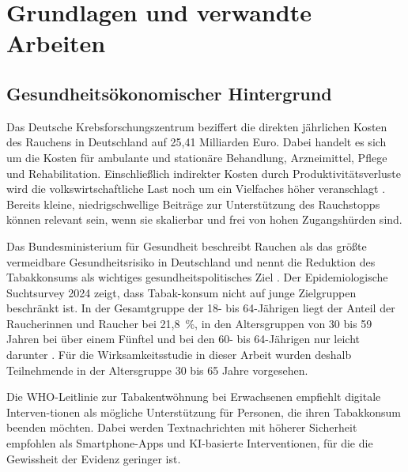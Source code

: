 

\chapter{Grundlagen und verwandte Arbeiten}

\section{Gesundheitsökonomischer Hintergrund}

Das Deutsche Krebsforschungszentrum beziffert die direkten jährlichen Kosten des Rauchens in Deutschland auf 25,41 Milliarden Euro. Dabei handelt es sich um die Kosten für ambulante und stationäre Behandlung, Arzneimittel, Pflege und Rehabilitation. Einschließlich indirekter Kosten durch Produktivitätsverluste wird die volkswirtschaftliche Last noch um ein Vielfaches höher veranschlagt \cite{effertz_viarisio_kosten_rauchens_2015}. Bereits kleine, niedrigschwellige Beiträge zur Unterstützung des Rauchstopps können relevant sein, wenn sie skalierbar und frei von hohen Zugangshürden sind.

Das Bundesministerium für Gesundheit beschreibt Rauchen als das größte vermeidbare Gesundheitsrisiko in Deutschland und nennt die Reduktion des Tabakkonsums als wichtiges gesundheitspolitisches Ziel \cite{bmg_rauchen_2026}. Der Epidemiologische Suchtsurvey 2024 zeigt, dass Tabak-{\linebreak}konsum nicht auf junge Zielgruppen beschränkt ist. In der Gesamtgruppe der 18- bis 64-Jährigen liegt der Anteil der Raucherinnen und Raucher bei 21,8~\%, in den Altersgruppen von 30 bis 59 Jahren bei über einem Fünftel und bei den 60- bis 64-Jährigen nur leicht darunter \cite{olk_esa_tabak_2026}. Für die Wirksamkeitsstudie in dieser Arbeit wurden deshalb Teilnehmende in der Altersgruppe 30 bis 65 Jahre vorgesehen.

Die WHO-Leitlinie zur Tabakentwöhnung bei Erwachsenen empfiehlt digitale Interven-{\linebreak}tionen als mögliche Unterstützung für Personen, die ihren Tabakkonsum beenden möchten. Dabei werden Textnachrichten mit höherer Sicherheit empfohlen als Smartphone-Apps und KI-basierte Interventionen, für die die Gewissheit der Evidenz geringer ist.\\
\cite{who_tobacco_cessation_guideline_2024}

